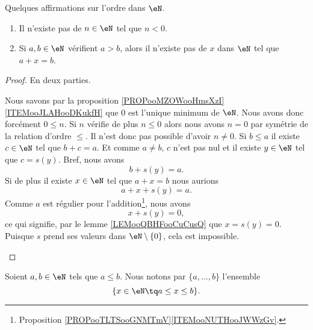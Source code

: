 \begin{lemma}       \label{LEMooYMRJooYIAhBb}
	Quelques affirmations sur l'ordre dans \( \eN\).
	\begin{enumerate}
		\item       \label{ITEMooTLOIooTWNtod}
		      Il n'existe pas de \( n\in \eN\) tel que \( n<0\).
		\item       \label{ITEMooPJKQooGfLCUM}
		      Si \( a,b\in \eN\) vérifient \( a>b\), alors il n'existe pas de \( x\) dans \( \eN\) tel que \( a+x=b\).
	\end{enumerate}
\end{lemma}

\begin{proof}
	En deux parties.
	\begin{subproof}
		Nous savons par la proposition \ref{PROPooMZOWooHmsXzI}\ref{ITEMooJLAHooDKukfH} que \( 0\) est l'unique minimum de \( \eN\). Nous avons donc forcément \( 0\leq n\). Si \( n\) vérifie de plus \( n\leq 0\) alors nous avons \( n=0\) par symétrie de la relation d'ordre \( \leq\). Il n'est donc pas possible d'avoir \( n\neq 0\).
		Si \( b\leq a\) il existe \( c\in \eN\) tel que \( b+c=a\). Et comme \( a\neq b\), \( c\) n'est pas nul et il existe \( y\in \eN\) tel que \( c=s(y)\). Bref, nous avons
		\begin{equation}
			b+s(y)=a.
		\end{equation}
		Si de plus il existe \( x\in \eN\) tel que \( a+x=b\) nous aurions
		\begin{equation}
			a+x+s(y)=a.
		\end{equation}
		Comme \( a\) est régulier pour l'addition\footnote{Proposition \ref{PROPooTLTSooGNMTmV}\ref{ITEMooNUTHooJWWzGv}.}, nous avons
		\begin{equation}
			x+s(y)=0,
		\end{equation}
		ce qui signifie, par le lemme \ref{LEMooQBHFooCuCusQ} que \( x=s(y)=0\). Puisque \( s\) prend ses valeurs dans \( \eN\setminus\{ 0 \}\), cela est impossible.
	\end{subproof}
\end{proof}

\begin{definition}      \label{DEFooKBUFooLvMHrf}
	Soient \( a,b\in \eN\) tels que \( a\leq b\). Nous notons par \( \{ a,\ldots, b \}\) l'ensemble
	\begin{equation}
		\{ x\in \eN\tq a\leq x\leq b \}.
	\end{equation}
\end{definition}

